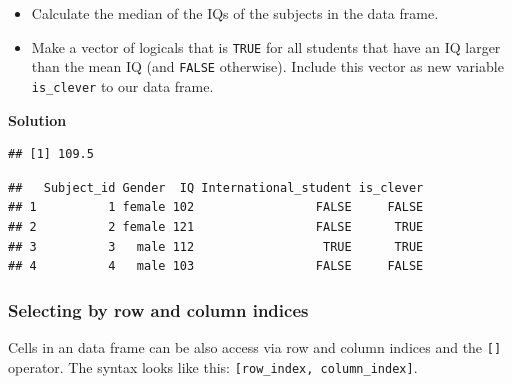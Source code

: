 \documentclass[
]{scrartcl}
\makeatletter
\newenvironment{Shaded}{\begin{snugshade}}{\end{snugshade}}
\newcommand{\KeywordTok}[1]{\textcolor[rgb]{0.13,0.29,0.53}{\textbf{#1}}}
\newcommand{\NormalTok}[1]{#1}
\newcommand{\OperatorTok}[1]{\textcolor[rgb]{0.81,0.36,0.00}{\textbf{#1}}}
\newcommand{\StringTok}[1]{\textcolor[rgb]{0.31,0.60,0.02}{#1}}
\providecommand{\tightlist}{%
  \setlength{\itemsep}{0pt}\setlength{\parskip}{0pt}}
\newenvironment{kframe}{%
\medskip{}
\setlength{\fboxsep}{.8em}
 \def\at@end@of@kframe{}%
 \ifinner\ifhmode%
  \def\at@end@of@kframe{\end{minipage}}%
  \begin{minipage}{\columnwidth}%
 \fi\fi%
 \def\FrameCommand##1{\hskip\@totalleftmargin \hskip-\fboxsep
 \colorbox{shadecolor}{##1}\hskip-\fboxsep
     \hskip-\linewidth \hskip-\@totalleftmargin \hskip\columnwidth}%
 \MakeFramed {\advance\hsize-\width
   \@totalleftmargin\z@ \linewidth\hsize
   \@setminipage}}%
 {\par\unskip\endMakeFramed%
 \at@end@of@kframe}
\newenvironment{rmdblock}[1]
  {
  \begin{itemize}
  \renewcommand{\labelitemi}{
    \raisebox{-.7\height}[0pt][0pt]{
      {\setkeys{Gin}{width=3em,keepaspectratio}\texttt{[image: images/\#1]}}
    }
  }
  \setlength{\fboxsep}{1em}
  \begin{kframe}
  \item
  }
  {
  \end{kframe}
  \end{itemize}
  }
\newenvironment{myexercise}
    {\begin{rmdblock}{exercise_green}}
    {\end{rmdblock}}
\newenvironment{webexsolution}[1]
    {\par\tiny\textbf{#1}}
    {\par}
\newcommand{\webexhide}[1]{\begin{webexsolution}{#1}}
\newcommand{\webexunhide}{\end{webexsolution}}
\makeatother
\begin{document}
\begin{myexercise}
\begin{itemize}
\tightlist
\item
  Calculate the median of the IQs of the subjects in the data frame.
\item
  Make a vector of logicals that is \texttt{TRUE} for all students that
  have an IQ larger than the mean IQ (and \texttt{FALSE} otherwise).
  Include this vector as new variable \texttt{is\_clever} to our data
  frame.
\end{itemize}
\end{myexercise}
\webexhide{Solution}

\begin{Shaded}
\end{Shaded}

\begin{verbatim}
## [1] 109.5
\end{verbatim}

\begin{Shaded}
\end{Shaded}

\begin{verbatim}
##   Subject_id Gender  IQ International_student is_clever
## 1          1 female 102                 FALSE     FALSE
## 2          2 female 121                 FALSE      TRUE
## 3          3   male 112                  TRUE      TRUE
## 4          4   male 103                 FALSE     FALSE
\end{verbatim}

\webexunhide

\hypertarget{selecting-by-row-and-column-indices}{%
\subsubsection{Selecting by row and column indices}\label{selecting-by-row-and-column-indices}}

Cells in an data frame can be also access via row and column indices and the \texttt{{[}{]}} operator. The syntax looks like this: \texttt{{[}row\_index,\ column\_index{]}}.
\end{document}
